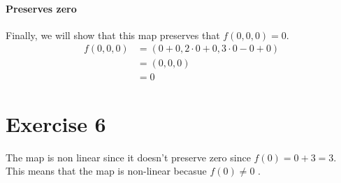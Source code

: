 \documentclass[a4paper]{article}
\begin{document}
\paragraph{Preserves zero} Finally, we will show that this map preserves that $f(0, 0, 0) = 0$.
\begin{align*}
  f(0, 0, 0)  &= (0 + 0, 2 \cdot 0 + 0, 3 \cdot 0 - 0 + 0) \\
              &= (0, 0, 0) \\
              &= 0
\end{align*}

\section*{Exercise 6}
The map is non linear since it doesn't preserve zero since $f(0) = 0 + 3 = 3$. This means that the map is non-linear becasue $f(0) \neq 0$   .
\end{document}
